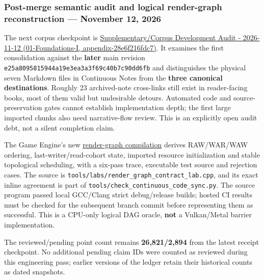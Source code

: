 \subsubsection{Post-merge semantic audit and logical render-graph reconstruction --- November 12, 2026}\label{appendix-3b67654799a2-post-merge-semantic-audit-and-logical-render-graph-reconstruction-november-12-2026}

The next corpus checkpoint is \href{../01-Foundations-I/main.pdf\#nameddest=appendix-28e6f216fdc7}{Supplementary/Corpus Development Audit - 2026-11-12 (01-Foundations-I, appendix-28e6f216fdc7)}. It examines the first consolidation against the \textbf{later} main revision \texttt{e25a8095815944a19e3ea3a3f69c40b7c90dd6fb} and distinguishes the physical seven Markdown files in Continuous Notes from the \textbf{three canonical destinations}. Roughly 23 archived-note cross-links still exist in reader-facing books, most of them valid but undesirable detours. Automated code and source-preservation gates cannot establish implementation depth; the first large imported chunks also need narrative-flow review. This is an explicitly open audit debt, not a silent completion claim.

The Game Engine's new \hyperref[06-engine-ii-ch042-from-a-list-of-render-passes-to-a-proved-execution-order]{render-graph compilation} derives RAW/WAR/WAW ordering, last-writer/read-cohort state, imported resource initialization and stable topological scheduling, with a six-pass trace, executable test source and rejection cases. The source is \texttt{tools/labs/render\_graph\_contract\_lab.cpp}, and its exact inline agreement is part of \texttt{tools/check\_continuous\_code\_sync.py}. The source program passed local GCC/Clang strict debug/release builds; hosted CI results must be checked for the subsequent branch commit before representing them as successful. This is a CPU-only logical DAG oracle, \textbf{not} a Vulkan/Metal barrier implementation.

The reviewed/pending point count remains \textbf{26,821/2,894} from the latest receipt checkpoint. No additional pending claim IDs were counted as reviewed during this engineering pass; earlier versions of the ledger retain their historical counts as dated snapshots.
